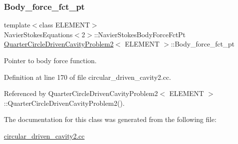 \subsubsection{\texorpdfstring{Body\+\_\+force\+\_\+fct\+\_\+pt}{Body\_force\_fct\_pt}}
{\footnotesize\ttfamily template$<$class E\+L\+E\+M\+E\+NT$>$ \\
Navier\+Stokes\+Equations$<$2$>$\+::Navier\+Stokes\+Body\+Force\+Fct\+Pt \hyperlink{classQuarterCircleDrivenCavityProblem2}{Quarter\+Circle\+Driven\+Cavity\+Problem2}$<$ E\+L\+E\+M\+E\+NT $>$\+::Body\+\_\+force\+\_\+fct\+\_\+pt\hspace{0.3cm}{\ttfamily [private]}}



Pointer to body force function. 



Definition at line 170 of file circular\+\_\+driven\+\_\+cavity2.\+cc.



Referenced by Quarter\+Circle\+Driven\+Cavity\+Problem2$<$ E\+L\+E\+M\+E\+N\+T $>$\+::\+Quarter\+Circle\+Driven\+Cavity\+Problem2().



The documentation for this class was generated from the following file\+:\begin{DoxyCompactItemize}
\item 
\hyperlink{circular__driven__cavity2_8cc}{circular\+\_\+driven\+\_\+cavity2.\+cc}\end{DoxyCompactItemize}
